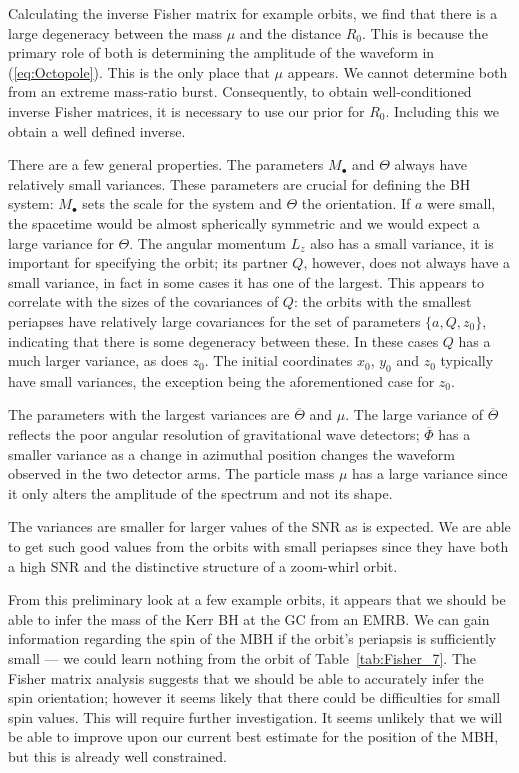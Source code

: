 \documentclass[useAMS,usedcolumn,usegraphicx,usenatbib]{mn2e}
\newcommand{\eqnref}[1]{(\ref{eq:#1})}
\newcommand{\tabref}[1]{Table~\ref{tab:#1}}
\begin{document}
Calculating the inverse Fisher matrix for example orbits, we find that there is a large degeneracy between the mass $\mu$ and the distance $R_0$. This is because the primary role of both is determining the amplitude of the waveform in \eqnref{Octopole}. This is the only place that $\mu$ appears. We cannot determine both from an extreme mass-ratio burst. Consequently, to obtain well-conditioned inverse Fisher matrices, it is necessary to use our prior for $R_0$. Including this we obtain a well defined inverse.

There are a few general properties. The parameters $M_\bullet$ and $\Theta$ always have relatively small variances. These parameters are crucial for defining the BH system: $M_\bullet$ sets the scale for the system and $\Theta$ the orientation. If $a$ were small, the spacetime would be almost spherically symmetric and we would expect a large variance for $\Theta$. The angular momentum $L_z$ also has a small variance, it is important for specifying the orbit; its partner $Q$, however, does not always have a small variance, in fact in some cases it has one of the largest. This appears to correlate with the sizes of the covariances of $Q$: the orbits with the smallest periapses have relatively large covariances for the set of parameters $\{a, Q, z_0\}$, indicating that there is some degeneracy between these. In these cases $Q$ has a much larger variance, as does $z_0$. The initial coordinates $x_0$, $y_0$ and $z_0$ typically have small variances, the exception being the aforementioned case for $z_0$.

The parameters with the largest variances are $\overline{\Theta}$ and $\mu$. The large variance of $\overline{\Theta}$ reflects the poor angular resolution of gravitational wave detectors; $\overline{\Phi}$ has a smaller variance as a change in azimuthal position changes the waveform observed in the two detector arms. The particle mass $\mu$ has a large variance since it only alters the amplitude of the spectrum and not its shape.

The variances are smaller for larger values of the SNR as is expected. We are able to get such good values from the orbits with small periapses since they have both a high SNR and the distinctive structure of a zoom-whirl orbit.

From this preliminary look at a few example orbits, it appears that we should be able to infer the mass of the Kerr BH at the GC from an EMRB. We can gain information regarding the spin of the MBH if the orbit's periapsis is sufficiently small --- we could learn nothing from the orbit of \tabref{Fisher_7}. The Fisher matrix analysis suggests that we should be able to accurately infer the spin orientation; however it seems likely that there could be difficulties for small spin values. This will require further investigation. It seems unlikely that we will be able to improve upon our current best estimate for the position of the MBH, but this is already well constrained.
\end{document}
